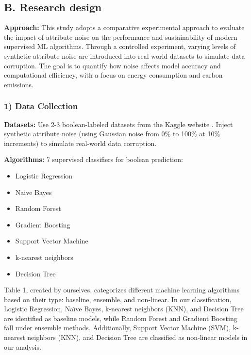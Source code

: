 \documentclass[conference]{IEEEtran}
\begin{document}
\subsection*{B. Research design}

\textbf{Approach:} This study adopts a comparative experimental approach to evaluate the impact of attribute noise on the performance and sustainability of modern supervised ML algorithms. Through a controlled experiment, varying levels of synthetic attribute noise are introduced into real-world datasets to simulate data corruption. The goal is to quantify how noise affects model accuracy and computational efficiency, with a focus on energy consumption and carbon emissions.
\newline
\subsubsection*{1) Data Collection}

\textbf{Datasets:} Use 2-3 boolean-labeled datasets from the Kaggle website \cite{kaggle}. Inject synthetic attribute noise (using Gaussian noise from 0\% to 100\% at 10\% increments) to simulate real-world data corruption.

\vspace{0.5em}
\textbf{Algorithms:} 7 supervised classifiers for boolean prediction:
\begin{itemize}[noitemsep, leftmargin=*]
    \item Logistic Regression
    \item Naive Bayes
    \item Random Forest
    \item Gradient Boosting
    \item Support Vector Machine
    \item k-nearest neighbors
    \item Decision Tree

\end{itemize}
\newline

\newline
\newline
\caption{Table 1, created by ourselves, categorizes different machine learning algorithms based on their type: baseline, ensemble, and non-linear. In our classification, Logistic Regression, Naïve Bayes, k-nearest neighbors (KNN), and Decision Tree are identified as baseline models, while Random Forest and Gradient Boosting fall under ensemble methods. Additionally, Support Vector Machine (SVM), k-nearest neighbors (KNN), and Decision Tree are classified as non-linear models in our analysis.}
\newline
\end{document}
